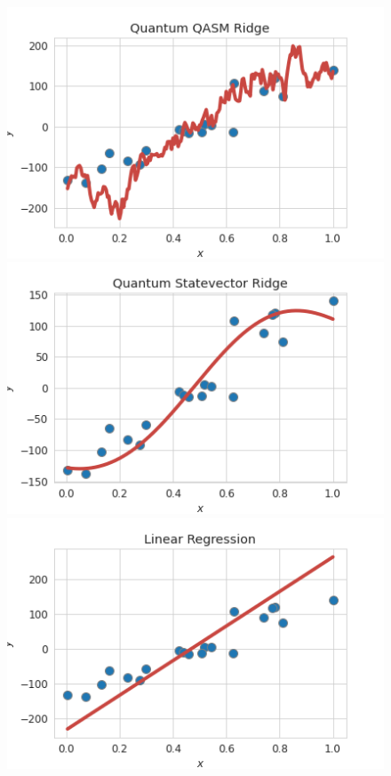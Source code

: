 \documentclass{article}
\begin{document}
\begin{multicols}{2}
\begin{figure}[H]
  \centering
    \includegraphics[width=\linewidth]{assets/ridge/Quantum QASM Ridge.png}
  \centering
    \includegraphics[width=\linewidth]{assets/ridge/Quantum Statevector Ridge.png}
  \centering
    \includegraphics[width=\linewidth]{assets/ridge/Linear Regression.png}
\end{figure}


\end{multicols}
\end{document}
